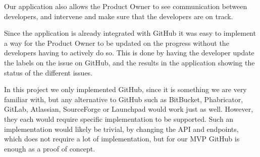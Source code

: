 Our application also allows the Product Owner to see communication between developers, and intervene and make sure that the developers are on track.

Since the application is already integrated with GitHub it was easy to implement a way for the Product Owner to be updated on the progress without the developers having to actively do so.
This is done by having the developer update the labels on the issue on GitHub, and the results in the application showing the status of the different issues. 

In this project we only implemented GitHub, since it is something we are very familiar with, but any alternative to GitHub such as BitBucket, Phabricator, GitLab, Atlassian, SourceForge or Launchpad would work just as well. However, they each would require specific implementation to be supported.
Such an implementation would likely be trivial, by changing the API and endpoints, which does not require a lot of implementation, but for our MVP GitHub is enough as a proof of concept.